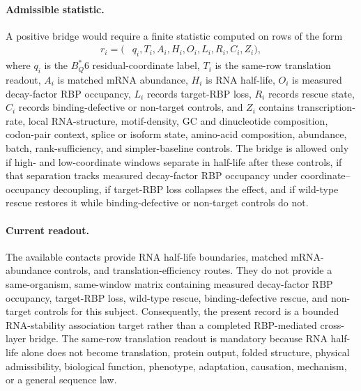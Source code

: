 \paragraph{Admissible statistic.} A positive bridge would require a finite statistic computed on rows of the form
$$
\begin{aligned}
  r_i = (&q_i, T_i, A_i, H_i, O_i, L_i, R_i, C_i, Z_i),
\end{aligned}
$$
where $q_i$ is the $B^*_Q6$ residual-coordinate label, $T_i$ is the same-row translation readout, $A_i$ is matched mRNA abundance, $H_i$ is RNA half-life, $O_i$ is measured decay-factor RBP occupancy, $L_i$ records target-RBP loss, $R_i$ records rescue state, $C_i$ records binding-defective or non-target controls, and $Z_i$ contains transcription-rate, local RNA-structure, motif-density, GC and dinucleotide composition, codon-pair context, splice or isoform state, amino-acid composition, abundance, batch, rank-sufficiency, and simpler-baseline controls. The bridge is allowed only if high- and low-coordinate windows separate in half-life after these controls, if that separation tracks measured decay-factor RBP occupancy under coordinate--occupancy decoupling, if target-RBP loss collapses the effect, and if wild-type rescue restores it while binding-defective or non-target controls do not.

\paragraph{Current readout.} The available contacts provide RNA half-life boundaries, matched mRNA-abundance controls, and translation-efficiency routes. They do not provide a same-organism, same-window matrix containing measured decay-factor RBP occupancy, target-RBP loss, wild-type rescue, binding-defective rescue, and non-target controls for this subject. Consequently, the present record is a bounded RNA-stability association target rather than a completed RBP-mediated cross-layer bridge. The same-row translation readout is mandatory because RNA half-life alone does not become translation, protein output, folded structure, physical admissibility, biological function, phenotype, adaptation, causation, mechanism, or a general sequence law.

